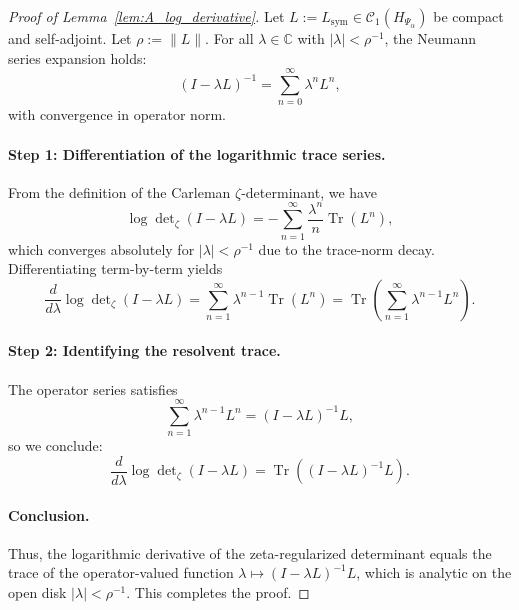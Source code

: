 \begin{proof}[Proof of Lemma~\ref{lem:A_log_derivative}]
Let \( L := L_{\mathrm{sym}} \in \mathcal{C}_1(H_{\Psi_\alpha}) \) be compact and self-adjoint. Let \( \rho := \|L\| \). For all \( \lambda \in \mathbb{C} \) with \( |\lambda| < \rho^{-1} \), the Neumann series expansion holds:
\[
(I - \lambda L)^{-1} = \sum_{n=0}^\infty \lambda^n L^n,
\]
with convergence in operator norm.

\paragraph{Step 1: Differentiation of the logarithmic trace series.}
From the definition of the Carleman \(\zeta\)-determinant, we have
\[
\log \det\nolimits_\zeta(I - \lambda L) = -\sum_{n=1}^\infty \frac{\lambda^n}{n} \operatorname{Tr}(L^n),
\]
which converges absolutely for \( |\lambda| < \rho^{-1} \) due to the trace-norm decay. Differentiating term-by-term yields
\[
\frac{d}{d\lambda} \log \det\nolimits_\zeta(I - \lambda L)
= \sum_{n=1}^\infty \lambda^{n-1} \operatorname{Tr}(L^n)
= \operatorname{Tr} \left( \sum_{n=1}^\infty \lambda^{n-1} L^n \right).
\]

\paragraph{Step 2: Identifying the resolvent trace.}
The operator series satisfies
\[
\sum_{n=1}^\infty \lambda^{n-1} L^n = (I - \lambda L)^{-1} L,
\]
so we conclude:
\[
\frac{d}{d\lambda} \log \det\nolimits_\zeta(I - \lambda L)
= \operatorname{Tr} \left( (I - \lambda L)^{-1} L \right).
\]

\paragraph{Conclusion.}
Thus, the logarithmic derivative of the zeta-regularized determinant equals the trace of the operator-valued function \( \lambda \mapsto (I - \lambda L)^{-1} L \), which is analytic on the open disk \( |\lambda| < \rho^{-1} \). This completes the proof.
\end{proof}
%  
